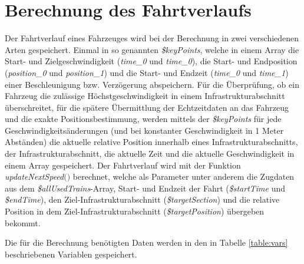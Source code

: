 \section{Berechnung des Fahrtverlaufs}

Der Fahrtverlauf eines Fahrzeuges wird bei der Berechnung in zwei verschiedenen Arten gespeichert. Einmal in so genannten \textit{\$keyPoints}, welche in einem Array die Start- und Zielgeschwindigkeit (\textit{time\_0} und \textit{time\_0}), die Start- und Endposition (\textit{position\_0} und \textit{position\_1}) und die Start- und Endzeit (\textit{time\_0} und \textit{time\_1}) einer Beschleunigung bzw. Verzögerung abspeichern. Für die Überprüfung, ob ein Fahrzeug die zulässige Höchstgeschwindigkeit in einem Infrastrukturabschnitt überschreitet, für die spätere Übermittlung der Echtzeitdaten an das Fahrzeug und die exakte Positionsbestimmung, werden mittels der \textit{\$keyPoints} für jede Geschwindigkeitsänderungen (und bei konstanter Geschwindigkeit in 1 Meter Abständen) die aktuelle relative Position innerhalb eines Infrastrukturabschnitts, der Infrastrukturabschnitt, die aktuelle Zeit und die aktuelle Geschwindigkeit in einem Array gespeichert.
Der Fahrtverlauf wird mit der Funktion \textit{updateNextSpeed$($$)$} berechnet, welche als Parameter unter anderem die Zugdaten aus dem \textit{\$allUsedTrains}-Array, Start- und Endzeit der Fahrt (\textit{\$startTime} und \textit{\$endTime}), den Ziel-Infrastrukturabschnitt (\textit{\$targetSection}) und die relative Position in dem Ziel-Infrastrukturabschnitt (\textit{\$targetPosition}) übergeben bekommt.

Die für die Berechnung benötigten Daten werden in den in Tabelle \ref{table:vars} beschriebenen Variablen gespeichert.

